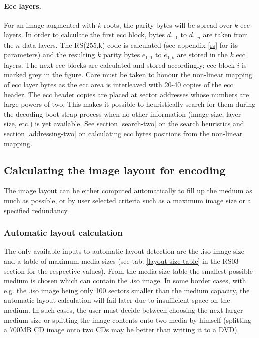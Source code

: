 \paragraph{Ecc layers.} For an image augmented with $k$ roots, the parity bytes
will be spread over $k$ ecc layers. In order to calculate the first ecc block,
bytes $d_{1,1}$ to $d_{1,n}$ are taken from the $n$ data layers. The RS(255,k) code
is calculated (see appendix \ref{rs} for its parameters) and the resulting $k$
parity bytes $e_{1,1}$ to $e_{1,k}$ are stored in the $k$ ecc layers. 
The next ecc blocks are calculated and stored accordingly; ecc block $i$ 
is marked grey in the figure.
Care must be taken to honour the non-linear mapping of
ecc layer bytes as the ecc area is interleaved with 20-40 copies of the ecc header.
The ecc header copies are placed at sector addresses whose numbers 
are large powers of two. This makes it possible to heuristically search for them
during the decoding boot-strap process 
when no other information (image size, layer size, etc.) is yet available.
See section \ref{search-two} on the search heuristics and section \ref{addressing-two}
on calculating ecc bytes positions from the non-linear mapping. 

\subsection{Calculating the image layout for encoding}

The image layout can be either computed automatically to fill up
the medium as much as possible, or by user selected criteria such
as a maximum image size or a specified redundancy.

\subsubsection{Automatic layout calculation}
\label{calc-two}

The only available inputs to automatic layout detection are
the .iso image size and a table of maximum media sizes (see
tab. \ref{layout-size-table} in the RS03 section for the
respective values). From the media size table the smallest
possible medium  is chosen which can contain the .iso image.
In some border cases, with e.g. the .iso image being only
100 sectors smaller than the medium capacity, the automatic
layout calculation will fail later due to insufficient space
on the medium. In such cases, the user must decide between
choosing the next larger medium size or splitting the image
contents onto two media by himself (splitting a 700MB CD image 
onto two CDs may be better than writing it to a DVD).

